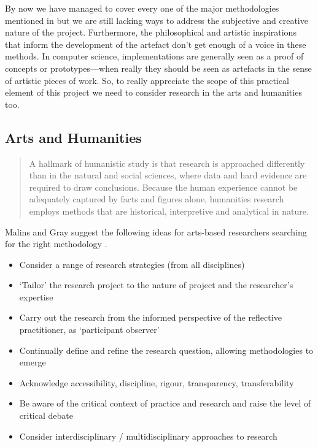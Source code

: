 By now we have managed to cover every one of the major methodologies mentioned in \autocite{Amaral2006} but we are still lacking ways to address the subjective and creative nature of the project. Furthermore, the philosophical and artistic inspirations that inform the development of the artefact don't get enough of a voice in these methods. In computer science, implementations are generally seen as a proof of concepts or prototypes---when really they should be seen as artefacts in the sense of artistic pieces of work. So, to really appreciate the scope of this practical element of this project we need to consider research in the arts and humanities too.


\subsection{Arts and Humanities}


\begin{quotation}
  A hallmark of humanistic study is that research is approached differently than in the natural and social sciences, where data and hard evidence are required to draw conclusions. Because the human experience cannot be adequately captured by facts and figures alone, humanities research employs methods that are historical, interpretive and analytical in nature. 
\end{quotation}

Malins and Gray suggest the following ideas for arts-based researchers searching for the right methodology \autocite*{Malins1995}.

\begin{itemize}
  \item Consider a range of research strategies (from all disciplines)
  \item `Tailor' the research project to the nature of project and the researcher's expertise
  \item Carry out the research from the informed perspective of the reflective practitioner, as `participant observer'
  \item Continually define and refine the research question, allowing methodologies to emerge
  \item Acknowledge accessibility, discipline, rigour, transparency, transferability
  \item Be aware of the critical context of practice and research and raise the level of critical debate
  \item Consider interdisciplinary / multidisciplinary approaches to research
\end{itemize}

